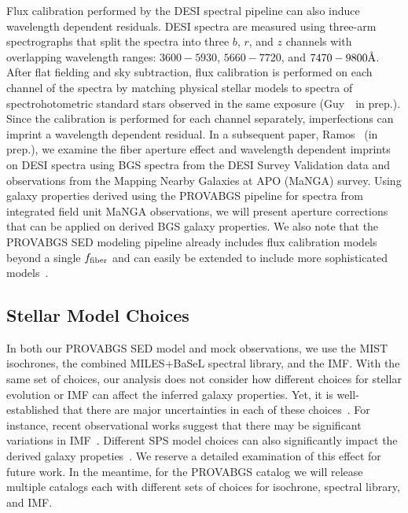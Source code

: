 Flux calibration performed by the DESI spectral pipeline can also induce
wavelength dependent residuals. 
DESI spectra are measured using three-arm spectrographs that split the spectra
into three $b$, $r$, and $z$ channels with overlapping wavelength ranges: 
$3600 - 5930$, $5660 - 7720$, and $7470 - 9800 \AA$.  
After flat fielding and sky subtraction, flux calibration is performed on each
channel of the spectra by matching physical stellar models to spectra of
spectrohotometric standard stars observed in the same exposure
(Guy~\etal~in prep.). 
Since the calibration is performed for each channel separately, imperfections
can imprint a wavelength dependent residual. 
In a subsequent paper, Ramos \etal~(in prep.), we examine the fiber aperture
effect and wavelength dependent imprints on DESI spectra using BGS
spectra from the DESI Survey Validation data and observations from the Mapping
Nearby Galaxies at APO (MaNGA) survey. 
Using galaxy properties derived using the {\sc PROVABGS} pipeline for spectra
from integrated field unit MaNGA observations, we will present aperture
corrections that can be applied on derived BGS galaxy properties. 
We also note that the {\sc PROVABGS} SED modeling pipeline already includes flux
calibration models beyond a single $f_{\rm fiber}$ and can easily be extended
to include more sophisticated models~\citep[\emph{e.g.} Chebyschev
polynomial;][]{carnall2019a, tacchella2021}. 

\subsection{Stellar Model Choices}
In both our {\sc PROVABGS} SED model and mock observations, we use the MIST
isochrones, the combined MILES+BaSeL spectral library, and the
\cite{chabrier2003} IMF.
With the same set of choices, our analysis does not consider how different
choices for stellar evolution or IMF can affect the inferred galaxy properties. 
Yet, it is well-established that there are major uncertainties in each of these
choices~\citep{conroy2009, conroy2013}.
For instance, recent observational works suggest that there may be significant
variations in IMF~\citep[\emph{e.g.}][]{treu2010, vandokkum2010, rosani2018,
sonnenfeld2019}. 
Different SPS model choices can also significantly impact the derived galaxy
propeties~\citep[\emph{e.g.}][]{ge2019}.
We reserve a detailed examination of this effect for future work. 
In the meantime, for the {\sc PROVABGS} catalog we will release multiple
catalogs each with different sets of choices for isochrone, spectral library,
and IMF.

